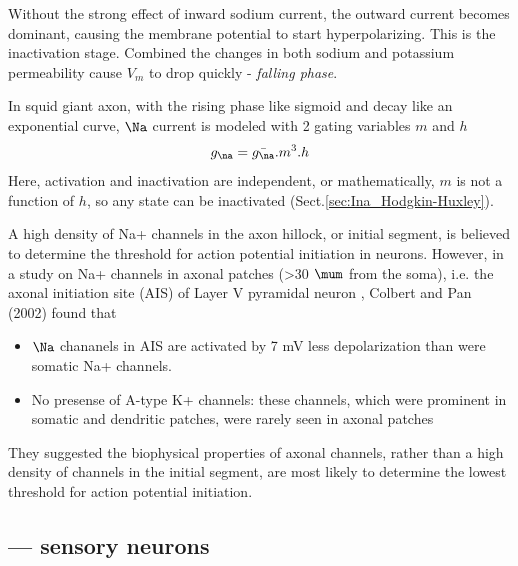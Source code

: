 Without the strong effect of inward sodium current, the outward current becomes
dominant, causing the membrane potential to start hyperpolarizing. This is the
inactivation stage.
Combined the changes in both sodium and potassium permeability cause $V_m$ to
drop quickly - {\it falling phase}.  

In squid giant axon, with the rising phase like sigmoid and decay like an
exponential curve, $\Na$ current is modeled with 2 gating variables $m$ and $h$
\citep{hodgkin1952ap}
\begin{equation}
g_\na = \bar{g_\na}.m^3.h
\end{equation}
Here, activation and inactivation are independent, or mathematically, $m$ is not
a function of $h$, so any state can be inactivated
(Sect.\ref{sec:Ina_Hodgkin-Huxley}).

A high density of Na+ channels in the axon hillock, or initial segment, is
believed to determine the threshold for action potential initiation in neurons.
However, in a study on Na+ channels in axonal patches (>30 $\mum$ from the
soma), i.e. the axonal initiation site (AIS) of Layer V pyramidal neuron ,
Colbert and Pan (2002) found that
\begin{itemize}
  \item $\Na$ chananels in AIS are activated by 7 mV less depolarization
than were somatic Na+ channels.

  \item No presense of A-type K+ channels: these channels, which were prominent
  in somatic and dendritic patches, were rarely seen in axonal patches
\end{itemize}

They suggested the biophysical properties of axonal channels, rather than a high
density of channels in the initial segment, are most likely to determine the
lowest threshold for action potential initiation.


\subsection{--- sensory neurons}

